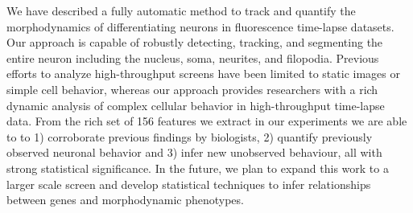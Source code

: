 We have described a  fully  automatic  method to  track  and  quantify  the
morphodynamics of  differentiating neurons in  fluorescence time-lapse
datasets.     Our  approach is capable of robustly detecting,
tracking, and segmenting the entire neuron including 
the nucleus, soma, neurites, and filopodia.  Previous efforts to analyze
high-throughput screens have been limited to static images or simple cell
behavior, whereas our approach provides researchers with a rich dynamic 
analysis of complex cellular behavior in high-throughput time-lapse data.
From the rich set of 156 features we extract in our experiments we are able to
 to 1) corroborate previous findings by biologists, 2) quantify previously observed neuronal behavior and 3) infer new unobserved behaviour, all with strong statistical significance.
In the future, we plan to expand this
work to a larger scale screen and develop statistical techniques to 
infer relationships between genes and morphodynamic phenotypes.










